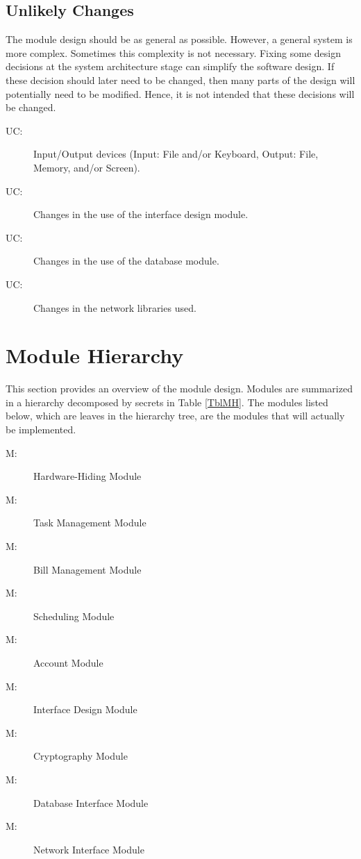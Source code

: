 \documentclass[12pt, titlepage]{article}
\newcounter{ucnum}
\newcommand{\uctheucnum}{UC\theucnum}
\newcounter{mnum}
\newcommand{\mthemnum}{M\themnum}
\begin{document}
\subsection{Unlikely Changes} \label{SecUchange}

The module design should be as general as possible. However, a general system is more complex. Sometimes this complexity is not necessary. Fixing some design
decisions at the system architecture stage can simplify the software design. If these decision should later need to be changed, then many parts of the design will potentially need to be modified. Hence, it is not intended that these decisions will be changed.

\begin{description}
\item[ \uctheucnum \label{ucIO}:] Input/Output devices
  (Input: File and/or Keyboard, Output: File, Memory, and/or Screen).
\item[ \uctheucnum \label{ucReact}:] Changes in the use of the interface design module.
\item[ \uctheucnum \label{ucDatabase}:] Changes in the use of the database  module.
\item[ \uctheucnum \label{ucNetwork}:] Changes in the network libraries used.
\end{description}

\section{Module Hierarchy} \label{SecMH}

This section provides an overview of the module design. Modules are summarized
in a hierarchy decomposed by secrets in Table \ref{TblMH}. The modules listed
below, which are leaves in the hierarchy tree, are the modules that will
actually be implemented.

\begin{description}
\item [ \mthemnum \label{mHH}:] Hardware-Hiding Module
\item [ \mthemnum \label{mT}:] Task Management Module
\item [ \mthemnum \label{mB}:] Bill Management Module
\item [ \mthemnum \label{mS}:] Scheduling Module
\item [ \mthemnum \label{mA}:] Account Module
\item [ \mthemnum \label{mI}:] Interface Design Module
\item [ \mthemnum \label{mC}:] Cryptography Module
\item [ \mthemnum \label{mD}:] Database Interface Module
\item [ \mthemnum \label{mN}:] Network Interface Module
\end{description}
\end{document}

